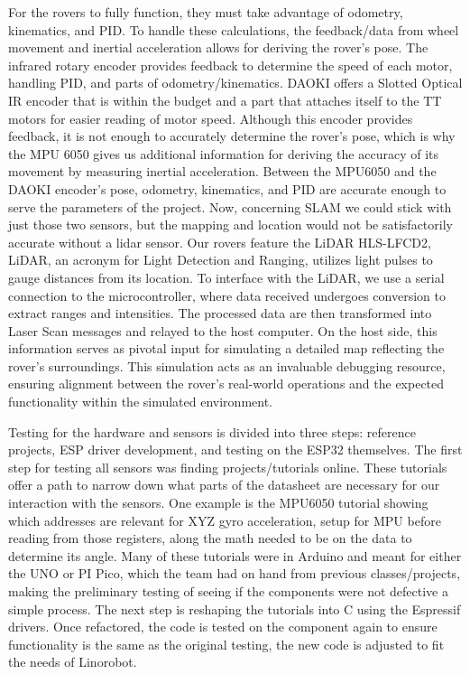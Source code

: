 \documentclass[conference]{IEEEtran}
\begin{document}
For the rovers to fully function, they must take advantage of odometry, kinematics, and PID. To handle these calculations, the feedback/data from wheel movement and inertial acceleration allows for deriving the rover's pose. The infrared rotary encoder provides feedback to determine the speed of each motor, handling PID, and parts of odometry/kinematics. DAOKI offers a Slotted Optical IR encoder that is within the budget and a part that attaches itself to the TT motors for easier reading of motor speed. Although this encoder provides feedback, it is not enough to accurately determine the rover's pose, which is why the MPU 6050 gives us additional information for deriving the accuracy of its movement by measuring inertial acceleration. Between the MPU6050 and the DAOKI encoder's pose, odometry, kinematics, and PID are accurate enough to serve the parameters of the project. Now, concerning SLAM we could stick with just those two sensors, but the mapping and location would not be satisfactorily accurate without a lidar sensor. Our rovers feature the LiDAR HLS-LFCD2, LiDAR, an acronym for Light Detection and Ranging, utilizes light pulses to gauge distances from its location. To interface with the LiDAR, we use a serial connection to the microcontroller, where data received undergoes conversion to extract ranges and intensities. The processed data are then transformed into Laser Scan messages and relayed to the host computer. On the host side, this information serves as pivotal input for simulating a detailed map reflecting the rover's surroundings. This simulation acts as an invaluable debugging resource, ensuring alignment between the rover's real-world operations and the expected functionality within the simulated environment.

Testing for the hardware and sensors is divided into three steps: reference projects, ESP driver development, and testing on the ESP32 themselves. The first step for testing all sensors was finding projects/tutorials online. These tutorials offer a path to narrow down what parts of the datasheet are necessary for our interaction with the sensors. One example is the MPU6050 tutorial showing which addresses are relevant for XYZ gyro acceleration, setup for MPU before reading from those registers, along the math needed to be on the data to determine its angle. Many of these tutorials were in Arduino and meant for either the UNO or PI Pico, which the team had on hand from previous classes/projects, making the preliminary testing of seeing if the components were not defective a simple process. The next step is reshaping the tutorials into C using the Espressif drivers. Once refactored, the code is tested on the component again to ensure functionality is the same as the original testing, the new code is adjusted to fit the needs of Linorobot.
\end{document}
